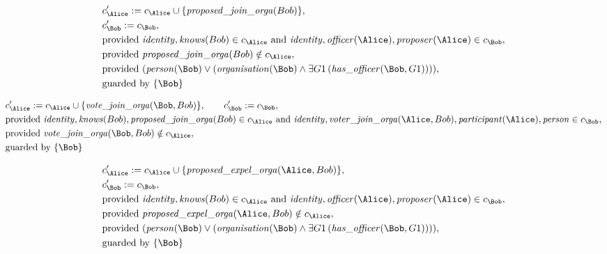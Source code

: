 \begin{align*}
&
c'_
{
\Alice
}
 := 
c_
{
\Alice
}
 \cup 
\{
\mathit{\detokenize{
proposed_join_orga
}}
(
Bob
)
\}
,\\
&
c'_
{
\Bob
}
 := 
c_
{
\Bob
}
,\\
&
\text{provided } 
\mathit{\detokenize{
identity
}}
,
\mathit{\detokenize{
knows
}}
(
Bob
)
 \in c_
{
\Alice
}
 \text{ and } 
\mathit{\detokenize{
identity
}}
,
\mathit{\detokenize{
officer
}}
(
\Alice
)
,
\mathit{\detokenize{
proposer
}}
(
\Alice
)
 \in c_
{
\Bob
}
,\\
&
\text{provided } 
\mathit{\detokenize{
proposed_join_orga
}}
(
Bob
)
 \notin c_
{
\Alice
}
,\\
&
\text{provided } 
(
\mathit{\detokenize{
person
}}
(
\Bob
)
\lor
(
\mathit{\detokenize{
organisation
}}
(
\Bob
)
\land
\exists 
G1
\,(
\mathit{\detokenize{
has_officer
}}
(
\Bob
,
G1
)
)
)
)
,\\
&
\text{guarded by } \{
\Bob
\}
\end{align*}

\begin{align*}
&
c'_
{
\Alice
}
 := 
c_
{
\Alice
}
 \cup 
\{
\mathit{\detokenize{
vote_join_orga
}}
(
\Bob
,
Bob
)
\}
, \qquad 
c'_
{
\Bob
}
 := 
c_
{
\Bob
}
,\\
&
\text{provided } 
\mathit{\detokenize{
identity
}}
,
\mathit{\detokenize{
knows
}}
(
Bob
)
,
\mathit{\detokenize{
proposed_join_orga
}}
(
Bob
)
 \in c_
{
\Alice
}
 \text{ and } 
\mathit{\detokenize{
identity
}}
,
\mathit{\detokenize{
voter_join_orga
}}
(
\Alice
,
Bob
)
,
\mathit{\detokenize{
participant
}}
(
\Alice
)
,
\mathit{\detokenize{
person
}}
 \in c_
{
\Bob
}
,\\
&
\text{provided } 
\mathit{\detokenize{
vote_join_orga
}}
(
\Bob
,
Bob
)
 \notin c_
{
\Alice
}
,\\
&
\text{guarded by } \{
\Bob
\}
\end{align*}

\begin{align*}
&
c'_
{
\Alice
}
 := 
c_
{
\Alice
}
 \cup 
\{
\mathit{\detokenize{
proposed_expel_orga
}}
(
\Alice
,
Bob
)
\}
,\\
&
c'_
{
\Bob
}
 := 
c_
{
\Bob
}
,\\
&
\text{provided } 
\mathit{\detokenize{
identity
}}
,
\mathit{\detokenize{
knows
}}
(
Bob
)
 \in c_
{
\Alice
}
 \text{ and } 
\mathit{\detokenize{
identity
}}
,
\mathit{\detokenize{
officer
}}
(
\Alice
)
,
\mathit{\detokenize{
proposer
}}
(
\Alice
)
 \in c_
{
\Bob
}
,\\
&
\text{provided } 
\mathit{\detokenize{
proposed_expel_orga
}}
(
\Alice
,
Bob
)
 \notin c_
{
\Alice
}
,\\
&
\text{provided } 
(
\mathit{\detokenize{
person
}}
(
\Bob
)
\lor
(
\mathit{\detokenize{
organisation
}}
(
\Bob
)
\land
\exists 
G1
\,(
\mathit{\detokenize{
has_officer
}}
(
\Bob
,
G1
)
)
)
)
,\\
&
\text{guarded by } \{
\Bob
\}
\end{align*}

